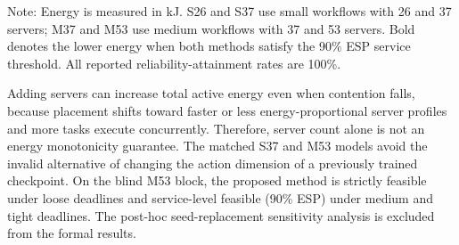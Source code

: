 \documentclass[lettersize,journal]{IEEEtran}
\begin{document}
\begin{table}[t]
\centering
\caption{Performance across workload--resource scales.}
\label{tab:scale_results}
\renewcommand{\arraystretch}{1.07}
\setlength{\tabcolsep}{6pt}
\vspace{1mm}
\parbox{0.98\textwidth}{\footnotesize
Note: Energy is measured in kJ. S26 and S37 use small workflows with 26 and 37
servers; M37 and M53 use medium workflows with 37 and 53 servers. Bold denotes
the lower energy when both methods satisfy the 90\% ESP service threshold. All
reported reliability-attainment rates are 100\%.}
\end{table}

Adding servers can increase total active energy even when contention falls,
because placement shifts toward faster or less energy-proportional server
profiles and more tasks execute concurrently. Therefore, server count alone is
not an energy monotonicity guarantee. The matched S37 and M53 models avoid the
invalid alternative of changing the action dimension of a previously trained
checkpoint. On the blind M53 block, the proposed method is strictly feasible
under loose deadlines and service-level feasible (90\% ESP) under medium and
tight deadlines. The post-hoc seed-replacement sensitivity analysis is excluded
from the formal results.
\end{document}
